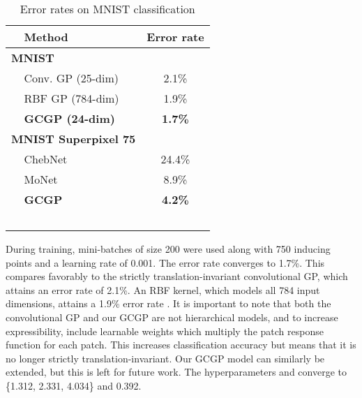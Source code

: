\documentclass{article}
\begin{document}
\begin{table}[tb]
	\centering
	\caption{Error rates on MNIST classification}
	\label{tab:MNIST}
	\begin{tabular}{llc}
		\toprule
				&Method & Error rate \\
		\midrule
    \multicolumn{2}{l}{\textbf{MNIST}} & \\ 
		&Conv. GP (25-dim) \dag	& 2.1\% \\
		&RBF GP (784-dim) \dag	& 1.9\% \\
		&\textbf{GCGP (24-dim)}	&\textbf{1.7\%} \\
		\midrule
		\multicolumn{2}{l}{\textbf{MNIST Superpixel 75}} & \\
		& ChebNet \citep{chebnet} & 24.4\% \\
		& MoNet \citep{moNet} & 8.9\% \\
		& \textbf{GCGP} & \textbf{4.2\%}\\
		\midrule
		& \dag\,\citep{convgp} & \\
	\end{tabular}
	\vspace{-0.75cm}
\end{table}

During training, mini-batches of size 200 were used along with 750 inducing points and a learning rate of 0.001. The error rate converges to 1.7\%. This compares favorably to the strictly translation-invariant convolutional GP, which attains an error rate of 2.1\%. An RBF kernel, which models all 784 input dimensions, attains a 1.9\% error rate \citep{convgp}. It is important to note that both the convolutional GP and our GCGP are not hierarchical models, and to increase expressibility, \citet{convgp} include learnable weights which multiply the patch response function for each patch. This increases classification accuracy but means that it is no longer strictly translation-invariant. Our GCGP model can similarly be extended, but this is left for future work. The hyperparameters  and  converge to \{1.312, 2.331, 4.034\} and 0.392.
\end{document}
